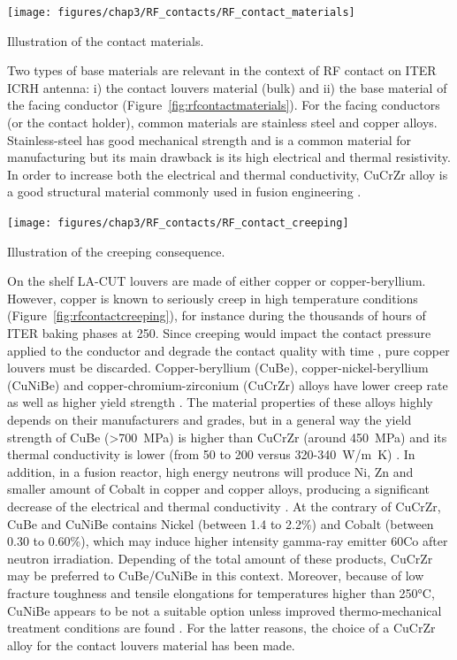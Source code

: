 {\begin{marginfigure}
	\centering
	\texttt{[image: figures/chap3/RF\_contacts/RF\_contact\_materials]}
	\caption{Illustration of the contact materials.}
	\label{fig:rfcontactmaterials}
\end{marginfigure}

Two types of base materials are relevant in the context of RF contact on ITER ICRH antenna: i) the contact louvers material (bulk) and ii) the base material of the facing conductor (Figure~\ref{fig:rfcontactmaterials}). For the facing conductors (or the contact holder), common materials are stainless steel and copper alloys. Stainless-steel has good mechanical strength and is a common material for manufacturing but its main drawback is its high electrical and thermal resistivity. In order to increase both the electrical and thermal conductivity, CuCrZr alloy is a good structural material commonly used in fusion engineering  . 

\begin{marginfigure}
	\centering
	\texttt{[image: figures/chap3/RF\_contacts/RF\_contact\_creeping]}
	\caption{Illustration of the creeping consequence.}
	\label{fig:rfcontactcreeping}
\end{marginfigure}

On the shelf LA-CUT louvers are made of either copper or copper-beryllium. However, copper is known to seriously creep in high temperature conditions (Figure~\ref{fig:rfcontactcreeping}), for instance during the thousands of hours of ITER baking phases at 250\degC. Since creeping would impact the contact pressure applied to the conductor and degrade the contact quality with time , pure copper louvers must be discarded. Copper-beryllium (CuBe), copper-nickel-beryllium (CuNiBe) and copper-chromium-zirconium (CuCrZr) alloys have lower creep rate as well as higher yield strength . The material properties of these alloys highly depends on their manufacturers and grades, but in a general way the yield strength of CuBe (>700~MPa) is higher than CuCrZr (around 450~MPa) and its thermal conductivity is lower (from 50 to 200 versus 320-340~\si{W/m.K}) \cite{li2012}. In addition, in a fusion reactor, high energy neutrons will produce Ni, Zn and smaller amount of Cobalt in copper and copper alloys, producing a significant decrease of the electrical and thermal conductivity  . At the contrary of CuCrZr, CuBe and CuNiBe contains Nickel (between 1.4 to 2.2\%) and Cobalt (between 0.30 to 0.60\%), which may induce higher intensity gamma-ray emitter 60Co after neutron irradiation. Depending of the total amount of these products, CuCrZr may be preferred to CuBe/CuNiBe in this context. Moreover, because of low fracture toughness and tensile elongations for temperatures higher than 250$\si{\degreeCelsius}$, CuNiBe appears to be not a suitable option unless improved thermo-mechanical treatment conditions are found . For the latter reasons, the choice of a CuCrZr alloy for the contact louvers material has been made.

}

